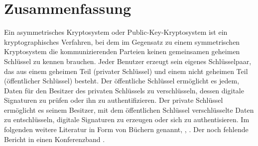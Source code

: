 \chapter{Zusammenfassung}
Ein asymmetrisches Kryptosystem oder Public-Key-Kryptosystem ist ein kryptographisches Verfahren, bei dem im Gegensatz zu einem symmetrischen Kryptosystem die kommunizierenden Parteien keinen gemeinsamen geheimen Schlüssel zu kennen brauchen. Jeder Benutzer erzeugt sein eigenes Schlüsselpaar, das aus einem geheimen Teil (privater Schlüssel) und einem nicht geheimen Teil (öffentlicher Schlüssel) besteht. Der öffentliche Schlüssel ermöglicht es jedem, Daten für den Besitzer des privaten Schlüssels zu verschlüsseln, dessen digitale Signaturen zu prüfen oder ihn zu authentifizieren. Der private Schlüssel ermöglicht es seinem Besitzer, mit dem öffentlichen Schlüssel verschlüsselte Daten zu entschlüsseln, digitale Signaturen zu erzeugen oder sich zu authentisieren.
Im folgenden weitere Literatur in Form von Büchern genannt\cite{krsog}, \cite{gb}, \cite{ak}.
Der noch fehlende Bericht in einen Konferenzband \cite{DBLP:conf/pkc/BernhardFW16}.
